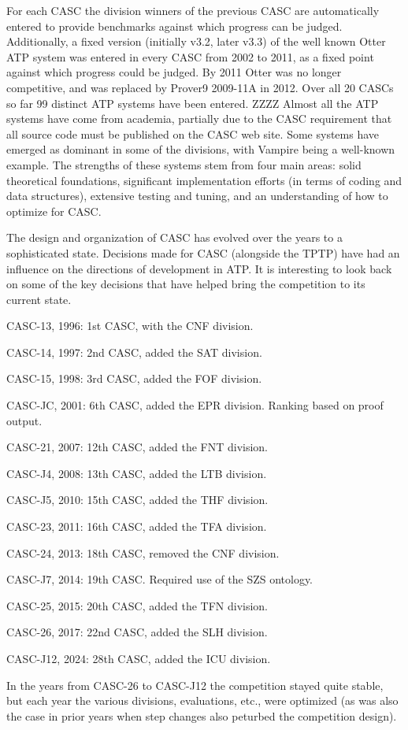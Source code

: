 \documentclass{easychair}
\newenvironment{packed_itemize}{
\vspace*{-0.2em}
\begin{itemize}
\setlength{\partopsep}{0pt}
\setlength{\itemsep}{1pt}
\setlength{\parskip}{0pt}
\setlength{\parsep}{0pt}
}{\end{itemize}}
\begin{document}
For each CASC the division winners of the previous CASC are automatically
entered to provide benchmarks against which progress can be judged.
Additionally, a fixed version (initially v3.2, later v3.3) of the well known 
Otter ATP system was entered in every CASC from 2002 to 2011, as a fixed 
point against which progress could be judged.
By 2011 Otter was no longer competitive, and was replaced by Prover9 2009-11A
in 2012.
Over all 20 CASCs so far 99 distinct ATP systems have been entered.  ZZZZ
Almost all the ATP systems have come from academia, partially due to the
CASC requirement that all source code must be published on the CASC web site.
Some systems have emerged as dominant in some of the divisions, with Vampire being a well-known
example.
The strengths of these systems stem from four main areas:
solid theoretical foundations, significant implementation efforts (in terms of coding and data 
structures), extensive testing and tuning, and an understanding of how to optimize for CASC.

The design and organization of CASC has evolved over the years to a sophisticated state.
Decisions made for CASC (alongside the TPTP) have had an influence on the directions of 
development in ATP.
It is interesting to look back on some of the key decisions that have helped bring the competition 
to its current state.
\begin{packed_itemize}
\item CASC-13, 1996: 1st CASC, with the CNF division.
\item CASC-14, 1997: 2nd CASC, added the SAT division.
\item CASC-15, 1998: 3rd CASC, added the FOF division.
\item CASC-JC, 2001: 6th CASC, added the EPR division. Ranking based on proof output.
\item CASC-21, 2007: 12th CASC, added the FNT division.
\item CASC-J4, 2008: 13th CASC, added the LTB division.
\item CASC-J5, 2010: 15th CASC, added the THF division.
\item CASC-23, 2011: 16th CASC, added the TFA division.
\item CASC-24, 2013: 18th CASC, removed the CNF division.
\item CASC-J7, 2014: 19th CASC. Required use of the SZS ontology.
\item CASC-25, 2015: 20th CASC, added the TFN division.
\item CASC-26, 2017: 22nd CASC, added the SLH division.
\item CASC-J12, 2024: 28th CASC, added the ICU division.
\end{packed_itemize}
In the years from CASC-26 to CASC-J12 the competition stayed quite stable, but each year
the various divisions, evaluations, etc., were optimized (as was also the case in prior years
when step changes also peturbed the competition design).
\end{document}
